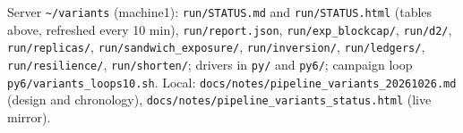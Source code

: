 \documentclass[10pt,a4paper]{article}
\begin{document}
Server \texttt{\textasciitilde{}/\allowbreak{}variants} (machine1): \texttt{run/\allowbreak{}STATUS.md} and \texttt{run/\allowbreak{}STATUS.html} (tables above, refreshed every 10 min), \texttt{run/\allowbreak{}report.json}, \texttt{run/\allowbreak{}exp\_blockcap/\allowbreak{}}, \texttt{run/\allowbreak{}d2/\allowbreak{}}, \texttt{run/\allowbreak{}replicas/\allowbreak{}}, \texttt{run/\allowbreak{}sandwich\_exposure/\allowbreak{}}, \texttt{run/\allowbreak{}inversion/\allowbreak{}}, \texttt{run/\allowbreak{}ledgers/\allowbreak{}}, \texttt{run/\allowbreak{}resilience/\allowbreak{}}, \texttt{run/\allowbreak{}shorten/\allowbreak{}}; drivers in \texttt{py/\allowbreak{}} and \texttt{py6/\allowbreak{}}; campaign loop \texttt{py6/\allowbreak{}variants\_loops10.sh}. Local: \texttt{docs/\allowbreak{}notes/\allowbreak{}pipeline\_variants\_20261026.md} (design and chronology), \texttt{docs/\allowbreak{}notes/\allowbreak{}pipeline\_variants\_status.html} (live mirror).
\end{document}
